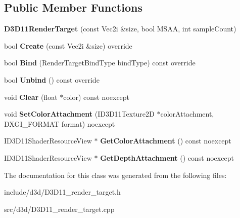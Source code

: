 \subsection*{Public Member Functions}
\begin{DoxyCompactItemize}
\item 
\mbox{\label{class_blade_1_1_d3_d11_render_target_adef14b01974b716aa68cffadacfcfd43}} 
{\bfseries D3\+D11\+Render\+Target} (const Vec2i \&size, bool M\+S\+AA, int sample\+Count)
\item 
\mbox{\label{class_blade_1_1_d3_d11_render_target_a050ec4d67f45491e1dfb92d7dfd7cc40}} 
bool {\bfseries Create} (const Vec2i \&size) override
\item 
\mbox{\label{class_blade_1_1_d3_d11_render_target_acabe7c18fb8a6cf52a5088653c5c500d}} 
bool {\bfseries Bind} (Render\+Target\+Bind\+Type bind\+Type) const override
\item 
\mbox{\label{class_blade_1_1_d3_d11_render_target_a9abf752799c1e0780dd25e4250622dfc}} 
bool {\bfseries Unbind} () const override
\item 
\mbox{\label{class_blade_1_1_d3_d11_render_target_ae689e2c81356685e5100b6d62eef53ee}} 
void {\bfseries Clear} (float $\ast$color) const noexcept
\item 
\mbox{\label{class_blade_1_1_d3_d11_render_target_a9430e7028c9517ba19bdb2957c649922}} 
void {\bfseries Set\+Color\+Attachment} (I\+D3\+D11\+Texture2D $\ast$color\+Attachment, D\+X\+G\+I\+\_\+\+F\+O\+R\+M\+AT format) noexcept
\item 
\mbox{\label{class_blade_1_1_d3_d11_render_target_a296069b64de6a78e2113acd49b978cb6}} 
I\+D3\+D11\+Shader\+Resource\+View $\ast$ {\bfseries Get\+Color\+Attachment} () const noexcept
\item 
\mbox{\label{class_blade_1_1_d3_d11_render_target_a3108ea56abb5804a38c0293b7034e11a}} 
I\+D3\+D11\+Shader\+Resource\+View $\ast$ {\bfseries Get\+Depth\+Attachment} () const noexcept
\end{DoxyCompactItemize}


The documentation for this class was generated from the following files\+:\begin{DoxyCompactItemize}
\item 
include/d3d/D3\+D11\+\_\+render\+\_\+target.\+h\item 
src/d3d/D3\+D11\+\_\+render\+\_\+target.\+cpp\end{DoxyCompactItemize}

